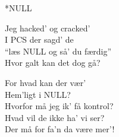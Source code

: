 \begin{song}{*NULL}
\begin{SBChorus}
  Jeg hacked' og cracked' \\
  I PCS der sagd' de \\
  ``læs NULL og så' du færdig'' \\
  Hvor galt kan det dog gå? \\
\end{SBChorus}

\medskip

\begin{SBSection*}
  For hvad kan der vær' \\
  Hem'ligt i NULL? \\
  Hvorfor må jeg ik' få kontrol? \\
  Hvad vil de ikke ha' vi ser? \\
  Der må for fa'n da være mer'! \\
\end{SBSection*}

\end{song}